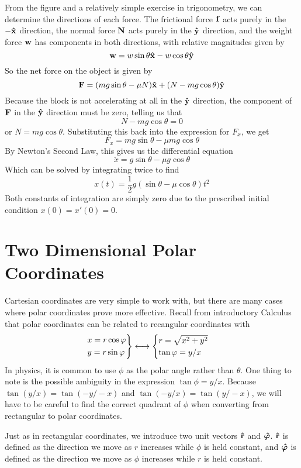 \begin{example}
    From the figure and a relatively simple exercise in trigonometry, we can determine the directions of each force. The frictional force $\mbf{f}$ acts purely in the $-\xhat$ direction, the normal force $\mbf{N}$ acts purely in the $\yhat$ direction, and the weight force $\mbf{w}$ has components in both directions, with relative magnitudes given by
    \[ \mbf{w} = w\sin\theta\xhat - w\cos\theta\yhat\]
    So the net force on the object is given by
    \[ \mbf{F} = (mg\sin\theta - \mu N)\xhat + (N - mg\cos\theta)\yhat\]
    Because the block is not accelerating at all in the $\yhat$ direction, the component of $\mbf{F}$ in the $\yhat$ direction must be zero, telling us that
    \[ N - mg\cos\theta = 0\]
    or $N = mg\cos\theta$. Substituting this back into the expression for $F_x$, we get
    \[ F_x = mg\sin\theta - \mu mg \cos\theta \]
    By Newton's Second Law, this gives us the differential equation
    \[ \ddot x = g\sin\theta - \mu g\cos \theta \]
    Which can be solved by integrating twice to find 
    \[ x(t) = \frac{1}{2}g(\sin\theta-\mu\cos\theta)t^2 \]
    Both constants of integration are simply zero due to the prescribed initial condition $x(0)=x'(0) = 0$.
\end{example}
\section{Two Dimensional Polar Coordinates}
Cartesian coordinates are very simple to work with, but there are many cases where polar coordinates prove more effective. Recall from introductory Calculus that polar coordinates can be related to recangular coordinates with
\[ 
\begin{rcases}
    x = r\cos\phi \\
    y = r\sin\phi
\end{rcases} \longleftrightarrow \begin{cases}
    r = \sqrt{x^2+y^2} \\
    \tan\phi = y/x
\end{cases}
\]
In physics, it is common to use $\phi$ as the polar angle rather than $\theta$. One thing to note is the possible ambiguity in the expression $\tan\phi = y/x$. Because $\tan(y/x) = \tan(-y/-x)$ and $\tan(-y/x) = \tan(y/-x)$, we will have to be careful to find the correct quadrant of $\phi$ when converting from rectangular to polar coordinates.

Just as in rectangular coordinates, we introduce two unit vectors $\rhat$ and $\phihat$. $\rhat$ is defined as the direction we move as $r$ increases while $\phi$ is held constant, and $\phihat$ is defined as the direction we move as $\phi$ increases while $r$ is held constant. 

